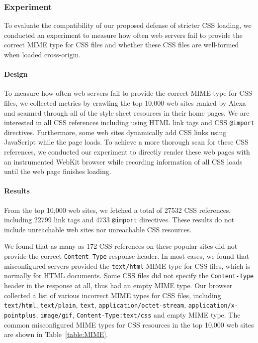 \documentclass{acm_proc_article-sp}
\begin{document}
\subsubsection{Experiment}
To evaluate the compatibility of our proposed defense of stricter CSS loading, we conducted an experiment to measure how often web servers fail to provide the correct MIME type for CSS files and whether these CSS files are well-formed when loaded cross-origin.

\paragraph{Design}
To measure how often web servers fail to provide the correct MIME type for CSS files, we collected metrics by crawling the top 10,000 web sites ranked by Alexa~\cite{alexa} and scanned through all of the style sheet resources in their home pages. We are interested in all CSS references including using HTML link tags and CSS \texttt{@import} directives. Furthermore, some web sites dynamically add CSS links using JavaScript while the page loads. To achieve a more thorough scan for these CSS references, we conducted our experiment to directly render these web pages with an instrumented WebKit browser while recording information of all CSS loads until the web page finishes loading.

\paragraph{Results}
From the top 10,000 web sites, we fetched a total of 27532 CSS references, including 22799 link tags and 4733 \texttt{@import} directives. These results do not include unreachable web sites nor unreachable CSS resources.

We found that as many as 172 CSS references on these popular sites did not provide the correct \texttt{Content-Type} response header. In most cases, we found that misconfigured servers provided the \texttt{text/html} MIME type for CSS files, which is normally for HTML documents. Some CSS files did not specify the \texttt{Content-Type} header in the response at all, thus had an empty MIME type. Our browser collected a list of various incorrect MIME types for CSS files, including \texttt{text/html}, \texttt{text/plain}, \texttt{text}, \texttt{application/octet-stream}, \texttt{application/x-pointplus}, \texttt{image/gif}, \texttt{Content-Type:text/css} and empty MIME type. The common misconfigured MIME types for CSS resources in the top 10,000 web sites are shown in Table~\ref{table:MIME}.
\end{document}
